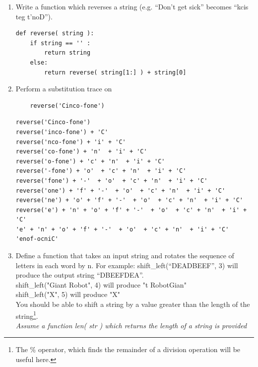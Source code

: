\documentclass[11pt]{article}
\author{Computer Science Community}
\newenvironment{answer}{\large\lstset{basicstyle=\large}\color{white}}{}
\newenvironment{answer}{\large\lstset{basicstyle=\large}\color{red}}{}
\begin{document}

\begin{enumerate}
    \item\label{reverse()} Write a function which reverses a string (e.g. ``Don't
        get sick'' becomes ``kcis teg t'noD'').

\begin{answer}
\begin{lstlisting}
def reverse( string ):
    if string == '' :
        return string
    else:
        return reverse( string[1:] ) + string[0]
\end{lstlisting}
\end{answer}

    \item Perform a substitution trace on 
    \begin{lstlisting}
    reverse('Cinco-fone')
    \end{lstlisting}

\begin{answer}
\begin{lstlisting}
reverse('Cinco-fone')
reverse('inco-fone') + 'C'
reverse('nco-fone') + 'i' + 'C'
reverse('co-fone') + 'n'  + 'i' + 'C'
reverse('o-fone') + 'c' + 'n'  + 'i' + 'C'
reverse('-fone') + 'o'  + 'c' + 'n'  + 'i' + 'C'
reverse('fone') + '-'  + 'o'  + 'c' + 'n'  + 'i' + 'C'
reverse('one') + 'f' + '-'  + 'o'  + 'c' + 'n'  + 'i' + 'C'
reverse('ne') + 'o' + 'f' + '-'  + 'o'  + 'c' + 'n'  + 'i' + 'C'
reverse('e') + 'n' + 'o' + 'f' + '-'  + 'o'  + 'c' + 'n'  + 'i' + 'C'
'e' + 'n' + 'o' + 'f' + '-'  + 'o'  + 'c' + 'n'  + 'i' + 'C'
'enof-ocniC'
\end{lstlisting}
\end{answer}
\pagebreak
    \item Define a function that takes an input string and rotates the sequence
        of letters in each word by n. For example: shift\_left(``DEADBEEF'', 3)
        will produce the output string ``DBEEFDEA''. \\ shift\_left("Giant Robot", 4) will produce "t RobotGian"\\ 
        shift\_left("X", 5) will produce "X" \\You should be able to
        shift a string by a value greater than the length of the
        string\footnote{The \% operator, which finds the remainder of a
        division operation will be useful here.}.\\ 
        \emph{Assume a function len( str ) which returns the length of a string is provided}



\end{enumerate}
\end{document}
